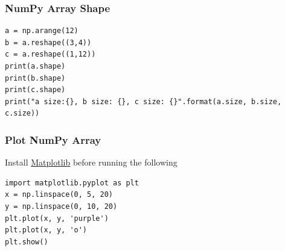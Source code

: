 \documentclass[12pt,letterpaper]{beamer}
\begin{document}
\begin{frame}[fragile]
    \frametitle{NumPy Array Shape}
    {\scriptsize
    \begin{verbatim}
a = np.arange(12)
b = a.reshape((3,4))
c = a.reshape((1,12))
print(a.shape)
print(b.shape)
print(c.shape)
print("a size:{}, b size: {}, c size: {}".format(a.size, b.size, c.size))
    \end{verbatim}
    }
\end{frame}

\begin{frame}[fragile]
    \frametitle{Plot NumPy Array}

    Install \href{https://matplotlib.org/}{Matplotlib} before running the following

    {\scriptsize
    \begin{verbatim}
import matplotlib.pyplot as plt
x = np.linspace(0, 5, 20)
y = np.linspace(0, 10, 20)
plt.plot(x, y, 'purple')
plt.plot(x, y, 'o')   
plt.show()
    \end{verbatim}
    }
\end{frame}
\end{document}
